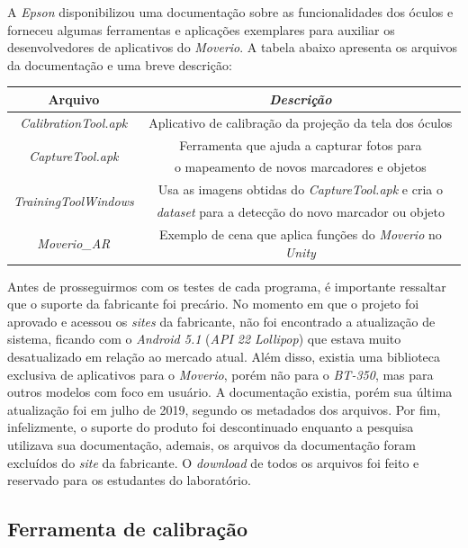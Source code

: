 A \textit{Epson} disponibilizou uma documentação sobre as funcionalidades dos óculos e forneceu algumas ferramentas e aplicações exemplares para auxiliar os desenvolvedores de aplicativos do \textit{Moverio}. A tabela abaixo apresenta os arquivos da documentação e uma breve descrição:

\begin{center}
    \begin{tabular}{ |c|c| } 
        \hline
        \textbf{Arquivo} & \textit{\textbf{Descrição}} \\ 
        \hline
        \textit{CalibrationTool.apk} & Aplicativo de calibração da projeção da tela dos óculos\\ 
        \hline
        \multirow{2}{*}{\textit{CaptureTool.apk}} & Ferramenta que ajuda a capturar fotos para \\  & o mapeamento de novos marcadores e objetos \\
        \hline
        \multirow{2}{*}{\textit{TrainingToolWindows}} & Usa as imagens obtidas do \textit{CaptureTool.apk} e cria o \\ & \textit{dataset} para a detecção do novo marcador ou objeto  \\
        \hline
        \textit{Moverio\_AR} & Exemplo de cena que aplica funções do \textit{Moverio} no \textit{Unity} \\ 
        \hline
    \end{tabular}
\end{center}

Antes de prosseguirmos com os testes de cada programa, é importante ressaltar que o suporte da fabricante foi precário. No momento em que o projeto foi aprovado e acessou os \textit{sites} da fabricante, não foi encontrado a atualização de sistema, ficando com o \textit{Android 5.1} (\textit{API 22 Lollipop}) que estava muito desatualizado em relação ao mercado atual. Além disso, existia uma biblioteca exclusiva de aplicativos para o \textit{Moverio}, porém não para o \textit{BT-350}, mas para outros modelos com foco em usuário. A documentação existia, porém sua última atualização foi em julho de 2019, segundo os metadados dos arquivos. Por fim, infelizmente, o suporte do produto foi descontinuado enquanto a pesquisa utilizava sua documentação, ademais, os arquivos da documentação foram excluídos do \textit{site} da fabricante. O \textit{download} de todos os arquivos foi feito e reservado para os estudantes do laboratório.

\subsection{Ferramenta de calibração}

